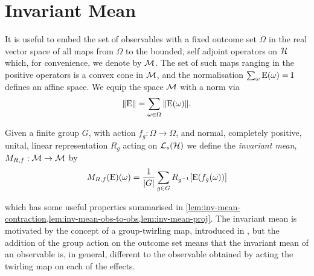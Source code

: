 \section{Invariant Mean}
\label{sec:invariant-mean}

It is useful to embed the set of observables with a fixed outcome set $\Omega$ in the real vector space of all maps from $\Omega$ to the bounded, self adjoint operators on $\mathcal{H}$  which, for convenience, we denote by $\mathcal{M}$. The set of such maps ranging in the positive operators is a convex cone in $\mathcal{M}$, and the normalisation $\sum_\omega\operatorname{E}(\omega) = \operatorname{I}$ defines an affine space. We equip the space $\mathcal{M}$ with a norm via
\begin{align}
  {\left\lVert{\operatorname{E}}\right\rVert} = \sum_{\omega\in\Omega} {\left\lVert{\operatorname{E}(\omega)}\right\rVert}.
\end{align}
\begin{defn}\label{defn:inv-mean}
  Given a finite group $G$, with action $f_g:\Omega\to\Omega$, and normal, completely positive, unital, linear representation $R_g$ acting on $\saops[\hcal]$ we define the \emph{invariant mean}, $M_{R,f}:\mathcal{M}\to\mathcal{M}$ by
  \begin{equation}\label{eqn:inv-mean-defn}
    M_{R,f}(\operatorname{E})(\omega) = \frac{1}{{\left\lvert{G}\right\rvert}}\sum_{g\in G} R_{g^{-1}}\! \left[\operatorname{E}(f_g(\omega))\right]
  \end{equation}
\end{defn}
which has some useful properties summarised in \cref{lem:inv-mean-contraction,lem:inv-mean-obs-to-obs,lem:inv-mean-proj}. The invariant mean is motivated by the concept of a group-twirling map, introduced in \cite{emerson-2005}, but the addition of the group action on the outcome set means that the invariant mean of an observable is, in general, different to the observable obtained by acting the twirling map on each of the effects.
